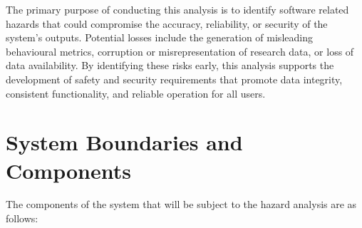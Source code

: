 \documentclass{article}
\begin{document}
The primary purpose of conducting this analysis is to identify software related hazards that could compromise the accuracy, reliability, or security of the system’s outputs. Potential losses include the generation of misleading behavioural metrics, corruption or misrepresentation of research data, or loss of data availability. By identifying these risks early, this analysis supports the development of safety and security requirements that promote data integrity, consistent functionality, and reliable operation for all users.

\section{System Boundaries and Components}

\par{ The components of the system that will be subject to the hazard analysis are as follows:}
\end{document}
